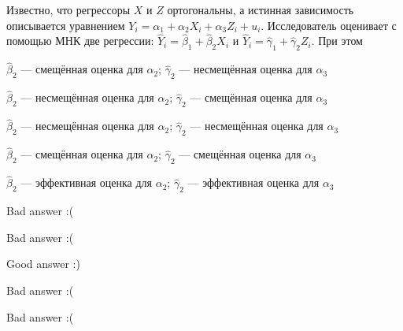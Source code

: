 
\begin{question}
Известно, что регрессоры \(X\) и \(Z\) ортогональны,
а истинная зависимость описывается уравнением
\(Y_i = \alpha_1 + \alpha_2 X_i + \alpha_3 Z_i + u_i\).
Исследователь оценивает с помощью МНК две регрессии:
\(\hat Y_i = \hat \beta_1 + \hat \beta_2 X_i\) и \(\hat Y_i = \hat \gamma_1 + \hat \gamma_2 Z_i\).
При этом
\begin{answerlist}
  \item \(\hat \beta_2\) --- смещённая оценка для \(\alpha_2\); \(\hat \gamma_2\) --- несмещённая оценка для \(\alpha_3\)
  \item \(\hat \beta_2\) --- несмещённая оценка для \(\alpha_2\); \(\hat \gamma_2\) --- смещённая оценка для \(\alpha_3\)
  \item \(\hat \beta_2\) --- несмещённая оценка для \(\alpha_2\); \(\hat \gamma_2\) --- несмещённая оценка для \(\alpha_3\)
  \item \(\hat \beta_2\) --- смещённая оценка для \(\alpha_2\); \(\hat \gamma_2\) --- смещённая оценка для \(\alpha_3\)
  \item \(\hat \beta_2\) --- эффективная оценка для \(\alpha_2\); \(\hat \gamma_2\) --- эффективная оценка для \(\alpha_3\)
\end{answerlist}
\end{question}

\begin{solution}
\begin{answerlist}
  \item Bad answer :(
  \item Bad answer :(
  \item Good answer :)
  \item Bad answer :(
  \item Bad answer :(
\end{answerlist}
\end{solution}

